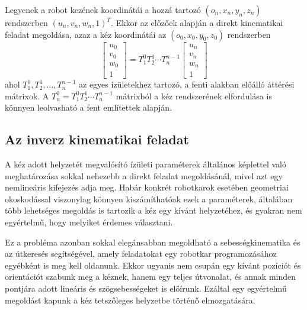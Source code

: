 \documentclass[12pt,a4paper]{report}
\theoremstyle{remark}
\theoremstyle{definition}
\begin{document}
Legyenek a robot kezének koordinátái a hozzá tartozó $(o_n, x_n, y_n, z_n)$ rendszerben $(u_n, v_n, w_n, 1)^T$. 
Ekkor az előzőek alapján a direkt kinematikai feladat megoldása, azaz a kéz koordinátái az $(o_0, x_0, y_0, z_0)$ 
rendszerben
\begin{equation}
\begin{bmatrix}
u_0 \\ 
v_0 \\ 
w_0 \\ 
1
\end{bmatrix} =
T^{0}_{1} T^{1}_{2} \cdots T^{n-1}_{n}
\begin{bmatrix}
u_n \\ 
v_n \\ 
w_n \\ 
1
\end{bmatrix}
\end{equation}
ahol $T^{0}_{1}, T^{1}_{2}, \ldots, T^{n-1}_{n}$ az egyes ízületekhez tartozó, a fenti alakban előálló áttérési 
mátrixok. A $T^{0}_{n} = T^{0}_{1} T^{1}_{2} \cdots T^{n-1}_{n}$ mátrixból a kéz rendszerének elfordulása is könnyen 
leolvasható a fent említettek alapján.

\subsection{Az inverz kinematikai feladat}
A kéz adott helyzetét megvalósító ízületi paraméterek általános képlettel való meghatározása sokkal nehezebb a 
direkt feladat megoldásánál, mivel azt egy nemlineáris kifejezés adja meg. Habár konkrét robotkarok esetében 
geometriai okoskodással viszonylag könnyen kiszámíthatóak ezek a paraméterek, általában több lehetséges megoldás is 
tartozik a kéz egy kívánt helyzetéhez, és gyakran nem egyértelmű, hogy melyiket érdemes választani. 

Ez a probléma azonban sokkal elegánsabban megoldható a sebességkinematika és az útkeresés segítségével, amely 
feladatokat egy robotkar programozásához egyébként is meg kell oldanunk. Ekkor ugyanis nem csupán egy kívánt 
pozíciót és orientációt szabunk meg a kéznek, hanem egy teljes útvonalat, és annak minden pontjára adott lineáris és 
szögsebességeket is előírunk. Ezáltal egy egyértelmű megoldást kapunk a kéz tetszőleges helyzetbe történő 
elmozgatására.
\end{document}
